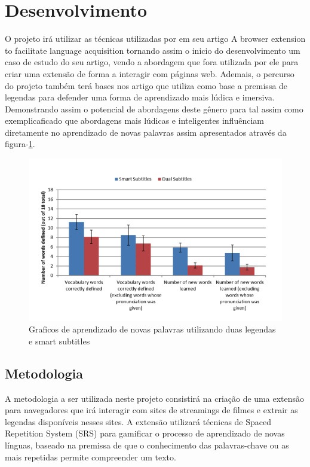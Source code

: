 \documentclass[12pt]{article}
\begin{document}
\section{Desenvolvimento}
O projeto irá utilizar as técnicas utilizadas por \cite{ElBatanony21} em seu artigo A browser extension to facilitate language acquisition tornando assim o inicio do desenvolvimento um caso de estudo do seu artigo, vendo a abordagem que fora utilizada por ele para criar uma extensão de forma a interagir com páginas web. Ademais, o percurso do projeto também terá bases nos artigo \cite{Kovacs14} que utiliza como base a premissa de legendas para defender uma forma de aprendizado mais lúdica e imersiva. Demonstrando assim o potencial de abordagens deste gênero para tal assim como exemplicaficado que abordagens mais lúdicas e inteligentes influênciam diretamente no aprendizado de novas palavras assim apresentados através da figura-\ref{fig:my_label}.

\begin{figure}
    \centering
    \caption{Graficos de aprendizado de novas palavras utilizando duas legendas e smart subtitles}
    \label{fig:my_label}
    \includegraphics[width=.7\textwidth]{image.png}
\end{figure}





\subsection{Metodologia}
A metodologia a ser utilizada neste projeto consistirá na criação de uma extensão para navegadores que irá interagir com sites de streamings de filmes e extrair as legendas disponíveis nesses sites. A extensão utilizará técnicas de Spaced Repetition System (SRS) para gamificar o processo de aprendizado de novas línguas, baseado na premissa de que o conhecimento das palavras-chave ou as mais repetidas permite compreender um texto. 
\end{document}
